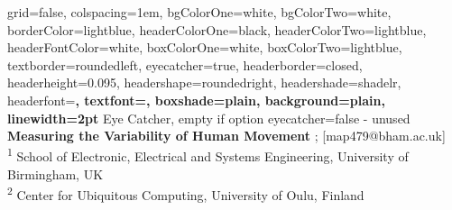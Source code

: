 \documentclass[a0paper,portrait]{baposter}
\begin{document}







\begin{poster}%
  {
  grid=false,
  colspacing=1em,
  bgColorOne=white,
  bgColorTwo=white,
  borderColor=lightblue,
  headerColorOne=black,
  headerColorTwo=lightblue,
  headerFontColor=white,
  boxColorOne=white,
  boxColorTwo=lightblue,
  textborder=roundedleft,
  eyecatcher=true,
  headerborder=closed,
  headerheight=0.095\textheight,
  headershape=roundedright,
  headershade=shadelr,
  headerfont=\Large\bf\textsc, %
  textfont={\setlength{\parindent}{1.5em}},
  boxshade=plain,
  background=plain,
  linewidth=2pt
  }
{
	Eye Catcher, empty if option eyecatcher=false - unused
}
{\bf
  {Measuring the Variability of Human Movement}
}
{
	{; [map479@bham.ac.uk]  } \\ 
	{\smaller
	\textsuperscript{1} School of Electronic, Electrical and Systems Engineering, University of Birmingham, UK \\
	\textsuperscript{2} Center for Ubiquitous Computing, University of Oulu, Finland }
}
  {%
  	\fbox{
    \begin{minipage}{11em}
    

\end{minipage}}}
\end{poster}
\end{document}

